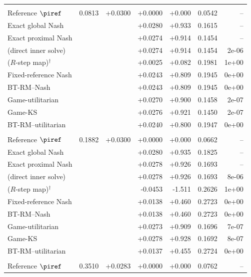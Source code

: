 \begin{tabular}{l r r r r r r}
\addlinespace
\multicolumn{7}{l}{\textit{$\alpha=0.50$}} \\
\quad Reference $\piref$ & 0.0813 & +0.0300 & +0.0000 & +0.000 & 0.0542 & -- \\
\quad Exact global Nash &  &  & +0.0280 & +0.933 & 0.1615 & -- \\
\quad Exact proximal Nash &  &  & +0.0274 & +0.914 & 0.1454 & -- \\
\quad \NBPO{} (direct inner solve) &  &  & +0.0274 & +0.914 & 0.1454 & 2e-06 \\
\quad \NBPO{} ($R$-step map)$^{\dagger}$ &  &  & +0.0025 & +0.082 & 0.1981 & 1e+00 \\
\quad Fixed-reference Nash &  &  & +0.0243 & +0.809 & 0.1945 & 0e+00 \\
\quad BT-RM--Nash &  &  & +0.0243 & +0.809 & 0.1945 & 0e+00 \\
\quad Game-utilitarian &  &  & +0.0270 & +0.900 & 0.1458 & 2e-07 \\
\quad Game-KS &  &  & +0.0276 & +0.921 & 0.1450 & 2e-07 \\
\quad BT-RM--utilitarian &  &  & +0.0240 & +0.800 & 0.1947 & 0e+00 \\
\addlinespace
\multicolumn{7}{l}{\textit{$\alpha=0.75$}} \\
\quad Reference $\piref$ & 0.1882 & +0.0300 & +0.0000 & +0.000 & 0.0662 & -- \\
\quad Exact global Nash &  &  & +0.0280 & +0.935 & 0.1825 & -- \\
\quad Exact proximal Nash &  &  & +0.0278 & +0.926 & 0.1693 & -- \\
\quad \NBPO{} (direct inner solve) &  &  & +0.0278 & +0.926 & 0.1693 & 8e-06 \\
\quad \NBPO{} ($R$-step map)$^{\dagger}$ &  &  & -0.0453 & -1.511 & 0.2626 & 1e+00 \\
\quad Fixed-reference Nash &  &  & +0.0138 & +0.460 & 0.2723 & 0e+00 \\
\quad BT-RM--Nash &  &  & +0.0138 & +0.460 & 0.2723 & 0e+00 \\
\quad Game-utilitarian &  &  & +0.0273 & +0.909 & 0.1696 & 7e-07 \\
\quad Game-KS &  &  & +0.0278 & +0.928 & 0.1692 & 8e-07 \\
\quad BT-RM--utilitarian &  &  & +0.0137 & +0.455 & 0.2724 & 0e+00 \\
\addlinespace
\multicolumn{7}{l}{\textit{$\alpha=1.00$}} \\
\quad Reference $\piref$ & 0.3510 & +0.0283 & +0.0000 & +0.000 & 0.0762 & -- \\

\end{tabular}
